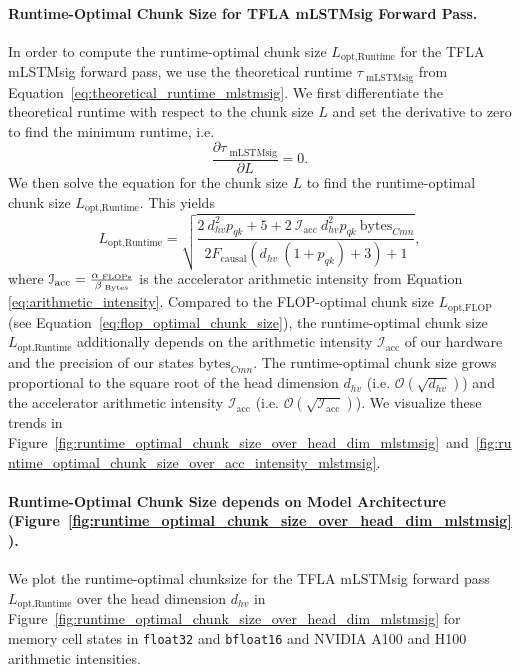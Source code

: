 \documentclass{article}
\begin{document}
    \paragraph{Runtime-Optimal Chunk Size for TFLA mLSTMsig Forward Pass.}
    In order to compute the runtime-optimal chunk size $L_\text{opt,Runtime}$ for the TFLA mLSTMsig forward pass, we use the theoretical runtime $\tau_\text{ mLSTMsig}$ from Equation~\eqref{eq:theoretical_runtime_mlstmsig}.
    We first differentiate the theoretical runtime with respect to the chunk size $L$ and set the derivative to zero to find the minimum runtime, i.e.
    \begin{equation}
        \frac{\partial \tau_\text{ mLSTMsig}}{\partial L} = 0.
    \end{equation}
    We then solve the equation for the chunk size $L$ to find the runtime-optimal chunk size $L_\text{opt,Runtime}$.
    This yields
    \begin{equation}
        L_\text{opt,Runtime} = \sqrt{ \frac{2 \ d_{hv}^2 p_{qk} + 5 + 2 \ \mathcal{I}_\text{acc} \  d_{hv}^2 p_{qk} \ \text{bytes}_{Cmn}}{2 F_\text{causal} \left( d_{hv} \ (1 + p_{qk}) + 3\right) + 1} }, 
    \end{equation}
    where $\mathcal{I}_\text{acc} = \frac{\alpha_{\text{ FLOPs}{{}}}}{\beta_{\text{ Bytes}{{}}}}$ is the accelerator arithmetic intensity from Equation \eqref{eq:arithmetic_intensity}. 
    Compared to the FLOP-optimal chunk size $L_\text{opt,FLOP}$ (see Equation~\eqref{eq:flop_optimal_chunk_size}), the runtime-optimal chunk size $L_\text{opt,Runtime}$ additionally depends on the arithmetic intensity $\mathcal{I}_\text{acc}$ of our hardware and the precision of our states $\text{bytes}_{Cmn}$.
    The runtime-optimal chunk size grows proportional to the square root of the head dimension $d_{hv}$ (i.e. $\mathcal{O}(\sqrt{d_{hv}})$) and the accelerator arithmetic intensity $\mathcal{I}_\text{acc}$ (i.e. $\mathcal{O}(\sqrt{\mathcal{I}_\text{acc}})$).
    We visualize these trends in Figure~\ref{fig:runtime_optimal_chunk_size_over_head_dim_mlstmsig}~and~\ref{fig:runtime_optimal_chunk_size_over_acc_intensity_mlstmsig}.
    
    \paragraph{Runtime-Optimal Chunk Size depends on Model Architecture (Figure~\ref{fig:runtime_optimal_chunk_size_over_head_dim_mlstmsig}).}
    We plot the runtime-optimal chunksize for the TFLA mLSTMsig forward pass $L_\text{opt,Runtime}$ over the head dimension $d_{hv}$ in Figure~\ref{fig:runtime_optimal_chunk_size_over_head_dim_mlstmsig} for memory cell states in \texttt{float32} and \texttt{bfloat16} and NVIDIA A100 and H100 arithmetic intensities.
    
\end{document}
